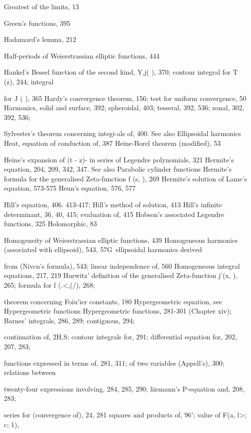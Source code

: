 Greatest of the limits, 13

Green's functions, 395

Hadamard's lemma, 212

Half-periods of Weierstrassian elliptic functions, 444

Hankel's Bessel function of the second kind, Y,j( ), 370; contour integral for T (z), 244; integral

for J ( ), 365
Hardy's convergence theorem, 156; test for uniform convergence, 50
Harmonics, solid and surface, 392; spheroidal, 403; tesseral, 392, 536; zonal, 302, 392, 536;

Sylvester's theorem concerning integi-als of, 400. See also Ellipsoidal harmonics
Heat, equation of conduction of, 387
Heine-Borel theorem (modified), 53

Heine's expansion of (t - z)-  in series of Legendre polynomials, 321
Hermite's equation, 204, 209, 342, 347. See also Parabolic cylinder functions
Hermite's formula for the generalised Zeta-function f (s,  ), 269
Hermite's solution of Lame's equation, 573-575
Heun's equation, 576, 577

Hill's equation, 406. 413-417; Hill's method of solution, 413
Hill's infinite determinant, 36, 40, 415; evaluation of, 415
Hobson's associated Legendre functions, 325
Holomorphic, 83

Homogeneity of Weierstrassian elliptic functions, 439
Homogeneous harmonics (associated with ellipsoid), 543, 57G\ ellipsoidal harmonics derived

from (Nivcn's formula), 543; linear independence of, 560
Homogeneous integral equations, 217, 219
Hurwitz' definition of the generalised Zeta-function j'(x,  ), 265; formula for f (.<,(/), 268;

theorem concerning Foiu'ier constants, 180
Hypergeometric equation, see Hypergeometric functions
Hypergeometric functions, 281-301 (Chapter xiv); Barnes' integrals, 286, 289; contiguous, 294;

continuation of, 2H,S; contour integrals for, 291; differential equation for, 202, 207, 283;

functions expressed in terms of, 281, 311; of two variables (Appell's), 300; relations between

twenty-four expressions involving, 284, 285, 290; liiemann's P-equation and, 208, 283;

series for (convergence of), 24, 281 squares and products of,  96'; value of F(a, l>; c; 1),

%
%

